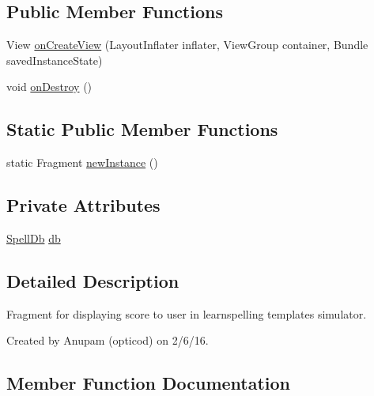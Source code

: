 \subsection*{Public Member Functions}
\begin{DoxyCompactItemize}
\item 
View \hyperlink{classorg_1_1buildmlearn_1_1toolkit_1_1learnspelling_1_1fragment_1_1LastFragment_abeeca52ada84ad29f33cbe6fbeaba446}{on\+Create\+View} (Layout\+Inflater inflater, View\+Group container, Bundle saved\+Instance\+State)
\item 
void \hyperlink{classorg_1_1buildmlearn_1_1toolkit_1_1learnspelling_1_1fragment_1_1LastFragment_a93f95aaf0ffd4e5315d1a99529106ec0}{on\+Destroy} ()
\end{DoxyCompactItemize}
\subsection*{Static Public Member Functions}
\begin{DoxyCompactItemize}
\item 
static Fragment \hyperlink{classorg_1_1buildmlearn_1_1toolkit_1_1learnspelling_1_1fragment_1_1LastFragment_ae8c3e100661147da3d2c08d39224e933}{new\+Instance} ()
\end{DoxyCompactItemize}
\subsection*{Private Attributes}
\begin{DoxyCompactItemize}
\item 
\hyperlink{classorg_1_1buildmlearn_1_1toolkit_1_1learnspelling_1_1data_1_1SpellDb}{Spell\+Db} \hyperlink{classorg_1_1buildmlearn_1_1toolkit_1_1learnspelling_1_1fragment_1_1LastFragment_ab4b7c2a07ad63f652f0a381bd950a116}{db}
\end{DoxyCompactItemize}


\subsection{Detailed Description}
Fragment for displaying score to user in learnspelling template\textquotesingle{}s simulator. 

Created by Anupam (opticod) on 2/6/16. 

\subsection{Member Function Documentation}
